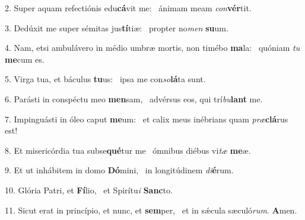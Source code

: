 2. Super aquam refectiónis edu\textbf{cá}vit me: \ast\  ánimam meam \textit{con}\textbf{vér}tit.\

3. Dedúxit me super sémitas jus\textbf{tí}tiæ: \ast\  propter no\textit{men} \textbf{su}um.\

4. Nam, etsi ambulávero in médio umbræ mortis, non timébo \textbf{ma}la: \ast\  quóniam \textit{tu} \textbf{me}cum es.\

5. Virga tua, et báculus \textbf{tu}us: \ast\  ipsa me con\textit{so}\textbf{lá}ta sunt.\

6. Parásti in conspéctu meo \textbf{men}sam, \ast\  advérsus eos, qui trí\textit{bu}\textbf{lant} me.\

7. Impinguásti in óleo caput \textbf{me}um: \ast\  et calix meus inébrians quam \textit{præ}\textbf{clá}rus est!\

8. Et misericórdia tua subse\textbf{qué}tur me \ast\  ómnibus diébus vi\textit{tæ} \textbf{me}æ.\

9. Et ut inhábitem in domo \textbf{Dó}mini, \ast\  in longitúdinem \textit{di}\textbf{é}rum.\

10. Glória Patri, et \textbf{Fí}lio, \ast\  et Spirítu\textit{i} \textbf{Sanc}to.\

11. Sicut erat in princípio, et nunc, et \textbf{sem}per, \ast\  et in sǽcula sæculó\textit{rum}. \textbf{A}men.\


